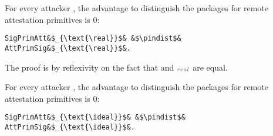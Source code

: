 \begin{lemma}\label{lem:prim:real}
    For every attacker \A, the advantage to distinguish
    the \real packages for remote attestation primitives
    is $0$: 
    \begin{center}
        \begin{minipage}{0.5\columnwidth}
    \begin{verbatim}
SigPrimAtt&$_{\text{\real}}$& &$\pindist$& AttPrimSig&$_{\text{\real}}$&.
    \end{verbatim}
    \end{minipage}
    \end{center}
\end{lemma}
%
\begin{IEEEproof}
    The proof is by reflexivity on the fact
    that \pattprim and \pattprim$_{\real}$ are
    equal.
\end{IEEEproof}
%
\begin{lemma}\label{lem:prim:ideal}
    For every attacker \A, the advantage to distinguish 
    the \ideal packages for remote attestation primitives
    is $0$: 
    \begin{center}
        \begin{minipage}{0.5\columnwidth}
    \begin{verbatim}
SigPrimAtt&$_{\text{\ideal}}$& &$\pindist$& AttPrimSig&$_{\text{\ideal}}$&.
    \end{verbatim}
    \end{minipage}
    \end{center}
\end{lemma}
%
